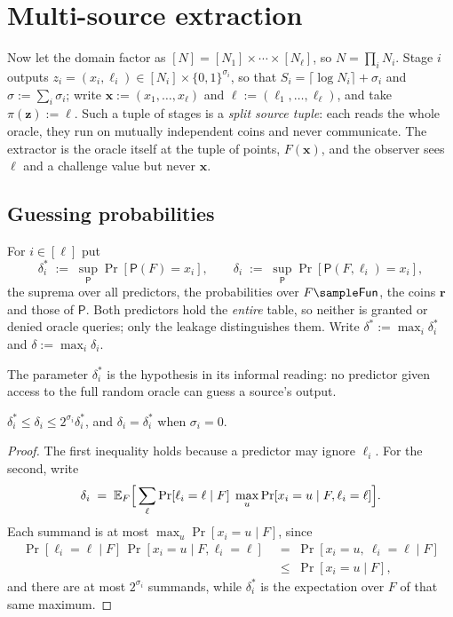 \documentclass{conjura-conjecture}
\newcommand{\Fun}{\mathsf{Fun}}
\newcommand{\Prob}[1]{\Pr\!\left[#1\right]}
\newcommand{\Exp}{\mathbb{E}}
\newcommand{\bits}{\{0,1\}}
\newcommand{\vz}{\mathbf{z}}
\newcommand{\vr}{\mathbf{r}}
\newcommand{\vx}{\mathbf{x}}
\newcommand{\vl}{\boldsymbol{\ell}}
\begin{document}
\section{Multi-source extraction}\label{sec:ext}

Now let the domain factor as $[N] = [N_1]\times\cdots\times[N_\ell]$, so
$N = \prod_i N_i$. Stage $i$ outputs
$z_i = (x_i,\ell_i) \in [N_i]\times\bits^{\sigma_i}$, so that
$S_i = \lceil\log N_i\rceil + \sigma_i$ and $\sigma := \sum_i \sigma_i$;
write $\vx := (x_1,\dots,x_\ell)$ and $\vl := (\ell_1,\dots,\ell_\ell)$,
and take $\pi(\vz) := \vl$. Such a tuple of stages is a \emph{split source
tuple}: each reads the whole oracle, they run on mutually independent
coins and never communicate. The extractor is the oracle itself at the
tuple of points, $F(\vx)$, and the observer sees $\vl$ and a challenge
value but never $\vx$.

\subsection{Guessing probabilities}\label{sec:delta}

\begin{definition}
\label{def:delta}
For $i \in [\ell]$ put
\[
  \delta^{\ast}_i \;:=\; \sup_{\mathsf{P}} \Prob{\mathsf{P}(F) = x_i},
  \qquad
  \delta_i \;:=\; \sup_{\mathsf{P}} \Prob{\mathsf{P}(F,\ell_i) = x_i},
\]
the suprema over all predictors, the probabilities over $F \sample \Fun$,
the coins $\vr$ and those of $\mathsf{P}$. Both predictors hold the
\emph{entire} table, so neither is granted or denied oracle queries; only
the leakage distinguishes them. Write
$\delta^{\ast} := \max_i \delta^{\ast}_i$ and $\delta := \max_i \delta_i$.
\end{definition}

The parameter $\delta^{\ast}_i$ is the hypothesis in its informal reading:
no predictor given access to the full random oracle can guess a source's
output.

\begin{lemma}\label{lem:leak}
$\delta^{\ast}_i \le \delta_i \le 2^{\sigma_i}\delta^{\ast}_i$, and
$\delta_i = \delta^{\ast}_i$ when $\sigma_i = 0$.
\end{lemma}

\begin{proof}
The first inequality holds because a predictor may ignore $\ell_i$. For
the second, write
\[
  \delta_i \;=\; \Exp_{F}\Bigl[\, \sum_{\ell} \Prob{\ell_i = \ell \mid F}
  \;\max_u \Prob{x_i = u \mid F, \ell_i = \ell} \Bigr] .
\]
Each summand is at most $\max_u \Prob{x_i = u \mid F}$, since
\begin{align*}
  \Prob{\ell_i = \ell \mid F}\,\Prob{x_i = u \mid F,\ell_i=\ell}
  &\;=\; \Prob{x_i = u,\ \ell_i = \ell \mid F} \\
  &\;\le\; \Prob{x_i = u \mid F} ,
\end{align*}
and there are at most $2^{\sigma_i}$ summands, while $\delta^{\ast}_i$ is
the expectation over $F$ of that same maximum.
\end{proof}
\end{document}
